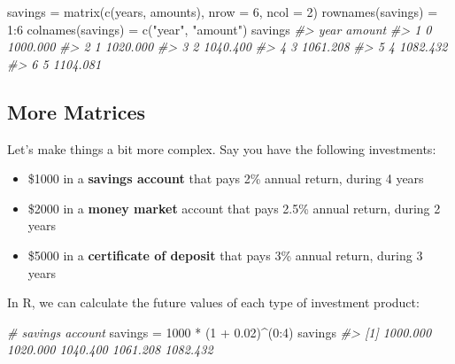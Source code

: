 \documentclass[
]{book}
\newenvironment{Shaded}{\begin{snugshade}}{\end{snugshade}}
\newcommand{\AttributeTok}[1]{\textcolor[rgb]{0.77,0.63,0.00}{#1}}
\newcommand{\CommentTok}[1]{\textcolor[rgb]{0.56,0.35,0.01}{\textit{#1}}}
\newcommand{\DecValTok}[1]{\textcolor[rgb]{0.00,0.00,0.81}{#1}}
\newcommand{\FloatTok}[1]{\textcolor[rgb]{0.00,0.00,0.81}{#1}}
\newcommand{\FunctionTok}[1]{\textcolor[rgb]{0.00,0.00,0.00}{#1}}
\newcommand{\NormalTok}[1]{#1}
\newcommand{\OtherTok}[1]{\textcolor[rgb]{0.56,0.35,0.01}{#1}}
\newcommand{\SpecialCharTok}[1]{\textcolor[rgb]{0.00,0.00,0.00}{#1}}
\newcommand{\StringTok}[1]{\textcolor[rgb]{0.31,0.60,0.02}{#1}}
\begin{document}
\begin{Shaded}
\begin{Highlighting}[]
\NormalTok{savings }\OtherTok{=} \FunctionTok{matrix}\NormalTok{(}\FunctionTok{c}\NormalTok{(years, amounts), }\AttributeTok{nrow =} \DecValTok{6}\NormalTok{, }\AttributeTok{ncol =} \DecValTok{2}\NormalTok{)}
\FunctionTok{rownames}\NormalTok{(savings) }\OtherTok{=} \DecValTok{1}\SpecialCharTok{:}\DecValTok{6}
\FunctionTok{colnames}\NormalTok{(savings) }\OtherTok{=} \FunctionTok{c}\NormalTok{(}\StringTok{"year"}\NormalTok{, }\StringTok{"amount"}\NormalTok{)}
\NormalTok{savings}
\CommentTok{\#\textgreater{}   year   amount}
\CommentTok{\#\textgreater{} 1    0 1000.000}
\CommentTok{\#\textgreater{} 2    1 1020.000}
\CommentTok{\#\textgreater{} 3    2 1040.400}
\CommentTok{\#\textgreater{} 4    3 1061.208}
\CommentTok{\#\textgreater{} 5    4 1082.432}
\CommentTok{\#\textgreater{} 6    5 1104.081}
\end{Highlighting}
\end{Shaded}

\hypertarget{more-matrices}{%
\subsection{More Matrices}\label{more-matrices}}

Let's make things a bit more complex. Say you have the following investments:

\begin{itemize}
\item
  \$1000 in a \textbf{savings account} that pays 2\% annual return, during 4 years
\item
  \$2000 in a \textbf{money market} account that pays 2.5\% annual return, during
  2 years
\item
  \$5000 in a \textbf{certificate of deposit} that pays 3\% annual return, during
  3 years
\end{itemize}

In R, we can calculate the future values of each type of investment product:

\begin{Shaded}
\begin{Highlighting}[]
\CommentTok{\# savings account}
\NormalTok{savings }\OtherTok{=} \DecValTok{1000} \SpecialCharTok{*}\NormalTok{ (}\DecValTok{1} \SpecialCharTok{+} \FloatTok{0.02}\NormalTok{)}\SpecialCharTok{\^{}}\NormalTok{(}\DecValTok{0}\SpecialCharTok{:}\DecValTok{4}\NormalTok{)}
\NormalTok{savings}
\CommentTok{\#\textgreater{} [1] 1000.000 1020.000 1040.400 1061.208 1082.432}
\end{Highlighting}
\end{Shaded}
\end{document}
